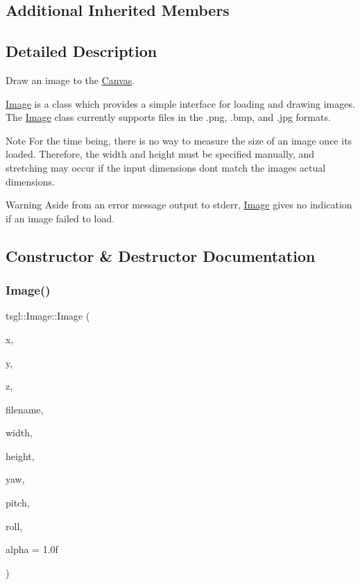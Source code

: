 \subsection*{Additional Inherited Members}


\subsection{Detailed Description}
Draw an image to the \hyperlink{classtsgl_1_1_canvas}{Canvas}. 

\hyperlink{classtsgl_1_1_image}{Image} is a class which provides a simple interface for loading and drawing images. The \hyperlink{classtsgl_1_1_image}{Image} class currently supports files in the .png, .bmp, and .jpg formats. \begin{DoxyNote}{Note}
For the time being, there is no way to measure the size of an image once it\textquotesingle{}s loaded. Therefore, the width and height must be specified manually, and stretching may occur if the input dimensions don\textquotesingle{}t match the images actual dimensions. 
\end{DoxyNote}
\begin{DoxyWarning}{Warning}
Aside from an error message output to stderr, \hyperlink{classtsgl_1_1_image}{Image} gives no indication if an image failed to load. 
\end{DoxyWarning}


\subsection{Constructor \& Destructor Documentation}
\mbox{\label{classtsgl_1_1_image_a98fa157fbdb5771729da59bc08b50a1b}} 
\subsubsection{\texorpdfstring{Image()}{Image()}}
{\footnotesize\ttfamily tsgl\+::\+Image\+::\+Image (\begin{DoxyParamCaption}\item[{float}]{x,  }\item[{float}]{y,  }\item[{float}]{z,  }\item[{std\+::string}]{filename,  }\item[{G\+Lfloat}]{width,  }\item[{G\+Lfloat}]{height,  }\item[{float}]{yaw,  }\item[{float}]{pitch,  }\item[{float}]{roll,  }\item[{float}]{alpha = {\ttfamily 1.0f} }\end{DoxyParamCaption})}




